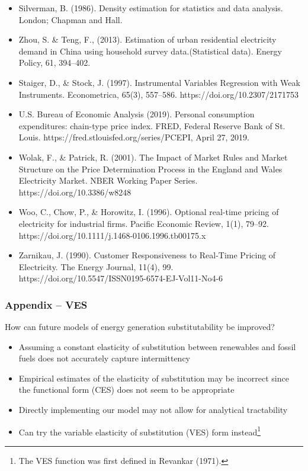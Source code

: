 \documentclass[aspectratio=169]{beamer}
\begin{document}
\begin{frame}[allowframebreaks]
\begin{itemize}
			\item Silverman, B. (1986). Density estimation for statistics and data analysis. London; Chapman and Hall.
			
			\item Zhou, S. \& Teng, F., (2013). Estimation of urban residential electricity demand in China using household survey data.(Statistical data). Energy Policy, 61, 394–402.
			
			\item Staiger, D., \& Stock, J. (1997). Instrumental Variables Regression with Weak Instruments. Econometrica, 65(3), 557–586. https://doi.org/10.2307/2171753
			
			\item U.S. Bureau of Economic Analysis (2019). Personal consumption expenditures: chain-type price index. FRED, Federal Reserve Bank of St. Louis. https://fred.stlouisfed.org/series/PCEPI, April 27, 2019.
			
			\item Wolak, F., \& Patrick, R. (2001). The Impact of Market Rules and Market Structure on the Price Determination Process in the England and Wales Electricity Market. NBER Working Paper Series. https://doi.org/10.3386/w8248
			
			\item Woo, C., Chow, P., \& Horowitz, I. (1996). Optional real-time pricing of electricity for industrial firms. Pacific Economic Review, 1(1), 79–92. https://doi.org/10.1111/j.1468-0106.1996.tb00175.x
			
			\item Zarnikau, J. (1990). Customer Responsiveness to Real-Time Pricing of Electricity. The Energy Journal, 11(4), 99. https://doi.org/10.5547/ISSN0195-6574-EJ-Vol11-No4-6
			
		\end{itemize}
		
	\end{frame}
	
	
	\begin{frame}
		\frametitle{Appendix -- VES}
		
		\begin{block}{How can future models of energy generation substitutability be improved?}
			\begin{itemize}
				\setlength\itemsep{0.5em}
				\item <1-> Assuming a constant elasticity of substitution between renewables and fossil fuels does not accurately capture intermittency
				\item <1-> Empirical estimates of the elasticity of substitution may be incorrect since the functional form (CES) does not seem to be appropriate 
				\item <1-> Directly implementing our model may not allow for analytical tractability
				\item <2-> Can try the variable elasticity of substitution (VES) form instead\footnote{The VES function was first defined in Revankar (1971).}
			\end{itemize}
		\end{block}
	\end{frame}
	
\end{document}
